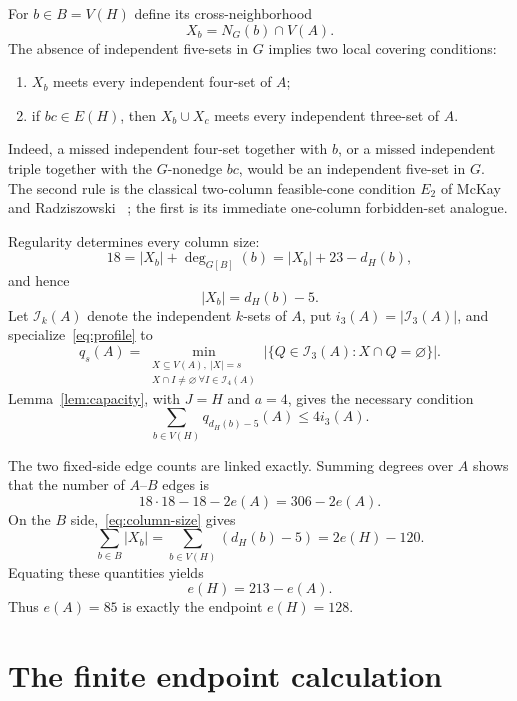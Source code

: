 \documentclass[11pt]{article}
\newcommand{\I}{\mathcal I}
\begin{document}
For $b\in B=V(H)$ define its cross-neighborhood
\[
 X_b=N_G(b)\cap V(A).
\]
The absence of independent five-sets in $G$ implies two local covering
conditions:
\begin{enumerate}
\item $X_b$ meets every independent four-set of $A$;
\item if $bc\in E(H)$, then $X_b\cup X_c$ meets every independent three-set
of $A$.
\end{enumerate}
Indeed, a missed independent four-set together with $b$, or a missed
independent triple together with the $G$-nonedge $bc$, would be an independent
five-set in $G$.  The second rule is the classical two-column feasible-cone
condition $E_2$ of McKay and Radziszowski
~\cite{mckay-radziszowski-r45}; the first is its immediate one-column
forbidden-set analogue.

Regularity determines every column size:
\[
 18=|X_b|+\deg_{G[B]}(b)=|X_b|+23-d_H(b),
\]
and hence
\begin{equation}\label{eq:column-size}
 |X_b|=d_H(b)-5.
\end{equation}
Let $\I_k(A)$ denote the independent $k$-sets of $A$, put
$i_3(A)=|\I_3(A)|$, and specialize~\eqref{eq:profile} to
\begin{equation}\label{eq:ramsey-profile}
 q_s(A)=
 \min_{\substack{X\subseteq V(A),\ |X|=s\\
 X\cap I\ne\varnothing\ \forall I\in\I_4(A)}}
 |\{Q\in\I_3(A):X\cap Q=\varnothing\}|.
\end{equation}
Lemma~\ref{lem:capacity}, with $J=H$ and $a=4$, gives the necessary condition
\begin{equation}\label{eq:ramsey-capacity}
 \boxed{\displaystyle
 \sum_{b\in V(H)}q_{d_H(b)-5}(A)\leq4i_3(A).}
\end{equation}

The two fixed-side edge counts are linked exactly.  Summing degrees over
$A$ shows that the number of $A$--$B$ edges is
\[
 18\cdot18-18-2e(A)=306-2e(A).
\]
On the $B$ side,~\eqref{eq:column-size} gives
\[
 \sum_{b\in B}|X_b|=\sum_{b\in V(H)}(d_H(b)-5)=2e(H)-120.
\]
Equating these quantities yields
\begin{equation}\label{eq:edge-balance}
 e(H)=213-e(A).
\end{equation}
Thus $e(A)=85$ is exactly the endpoint $e(H)=128$.

\section{The finite endpoint calculation}
\end{document}
